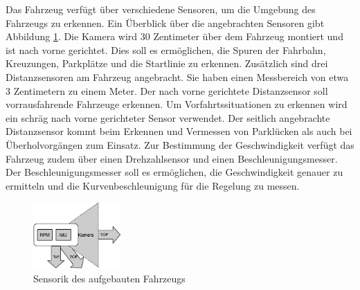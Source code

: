 Das Fahrzeug verfügt über verschiedene Sensoren, um die Umgebung des Fahrzeugs zu erkennen. Ein Überblick über die angebrachten Sensoren gibt Abbildung \ref{sen:auf}. Die Kamera wird 30 Zentimeter über dem Fahrzeug montiert und ist nach vorne gerichtet. Dies soll es ermöglichen, die Spuren der Fahrbahn, Kreuzungen, Parkplätze und die Startlinie zu erkennen. Zusätzlich sind drei Distanzsensoren am Fahrzeug angebracht. Sie haben einen Messbereich von etwa 3 Zentimetern zu einem Meter. Der nach vorne gerichtete Distanzsensor soll vorrausfahrende Fahrzeuge erkennen. Um Vorfahrtssituationen zu erkennen wird ein schräg nach vorne gerichteter Sensor verwendet. Der seitlich angebrachte Distanzsensor kommt beim Erkennen und Vermessen von Parklücken als auch bei Überholvorgängen zum Einsatz. Zur Bestimmung der Geschwindigkeit verfügt das Fahrzeug zudem über einen Drehzahlsensor und einen Beschleunigungsmesser. Der Beschleunigungsmesser soll es ermöglichen, die Geschwindigkeit genauer zu ermitteln und die Kurvenbeschleunigung für die Regelung zu messen.

\FloatBarrier
\begin{figure}[h]
  \centering
  \includegraphics[width=0.3\textwidth]{images/stand_der_technik/Sensoren.pdf}
  \caption[Sensorik des aufgebauten Fahrzeugs]{Sensorik des aufgebauten Fahrzeugs}
  \label{sen:auf}
\end{figure}
\FloatBarrier